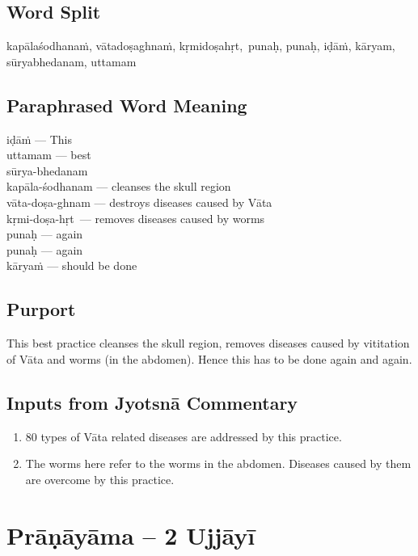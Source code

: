 \subsection*{Word Split}


kapālaśodhanaṁ, vātadoṣaghnaṁ, kṛmidoṣahṛt, punaḥ, punaḥ, iḍāṁ, kāryam, sūryabhedanam, uttamam

\subsection*{Paraphrased Word Meaning}


\begin{multicols}{2}
iḍāṁ --- This\\
uttamam --- best\\
sūrya-bhedanam \\
kapāla-śodhanam --- cleanses the skull region\\
vāta-doṣa-ghnam --- destroys diseases caused by Vāta\\
kṛmi-doṣa-hṛt ---  removes diseases caused by worms \\
punaḥ --- again \\
punaḥ --- again \\
kāryaṁ --- should be done
\end{multicols}

\subsection*{Purport}

This best practice cleanses the skull region, removes diseases caused by vititation of Vāta and worms (in the abdomen). Hence this has to be done again and again.

\subsection*{Inputs from Jyotsnā Commentary}

\begin{enumerate}
\itemsep=0pt
\item 80 types of Vāta related diseases are addressed by this practice. 
\item The worms here refer to the worms in the abdomen. Diseases caused by them are overcome by this practice.
\end{enumerate}

\section*{Prāṇāyāma – 2 Ujjāyī}

